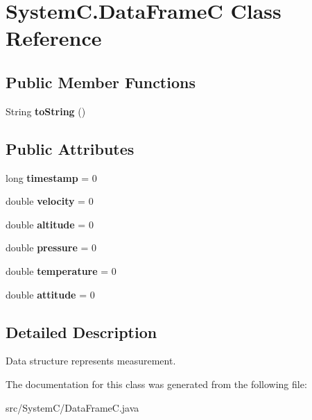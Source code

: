 \hypertarget{class_system_c_1_1_data_frame_c}{}\section{System\+C.\+Data\+Frame\+C Class Reference}
\label{class_system_c_1_1_data_frame_c}
\subsection*{Public Member Functions}
\begin{DoxyCompactItemize}
\item 
\hypertarget{class_system_c_1_1_data_frame_c_ae3fe9060aa10fd3f4618d3c978cef8c7}{}String {\bfseries to\+String} ()\label{class_system_c_1_1_data_frame_c_ae3fe9060aa10fd3f4618d3c978cef8c7}

\end{DoxyCompactItemize}
\subsection*{Public Attributes}
\begin{DoxyCompactItemize}
\item 
\hypertarget{class_system_c_1_1_data_frame_c_a1fe8f6bc1b27df6b9008d12eb5e8c23c}{}long {\bfseries timestamp} = 0\label{class_system_c_1_1_data_frame_c_a1fe8f6bc1b27df6b9008d12eb5e8c23c}

\item 
\hypertarget{class_system_c_1_1_data_frame_c_a2048d62256d15fcb1f1439c1a09e9be8}{}double {\bfseries velocity} = 0\label{class_system_c_1_1_data_frame_c_a2048d62256d15fcb1f1439c1a09e9be8}

\item 
\hypertarget{class_system_c_1_1_data_frame_c_a3ae39d6af9f2dd142faa05d6204929e1}{}double {\bfseries altitude} = 0\label{class_system_c_1_1_data_frame_c_a3ae39d6af9f2dd142faa05d6204929e1}

\item 
\hypertarget{class_system_c_1_1_data_frame_c_a05ce110949aecc7d0e01088a419e577c}{}double {\bfseries pressure} = 0\label{class_system_c_1_1_data_frame_c_a05ce110949aecc7d0e01088a419e577c}

\item 
\hypertarget{class_system_c_1_1_data_frame_c_acf27ad0b927934a2ee96dd08350b221e}{}double {\bfseries temperature} = 0\label{class_system_c_1_1_data_frame_c_acf27ad0b927934a2ee96dd08350b221e}

\item 
\hypertarget{class_system_c_1_1_data_frame_c_abc407a04f09d6a77d56010cbf83c3380}{}double {\bfseries attitude} = 0\label{class_system_c_1_1_data_frame_c_abc407a04f09d6a77d56010cbf83c3380}

\end{DoxyCompactItemize}


\subsection{Detailed Description}
Data structure represents measurement. 

The documentation for this class was generated from the following file\+:\begin{DoxyCompactItemize}
\item 
src/\+System\+C/Data\+Frame\+C.\+java\end{DoxyCompactItemize}
